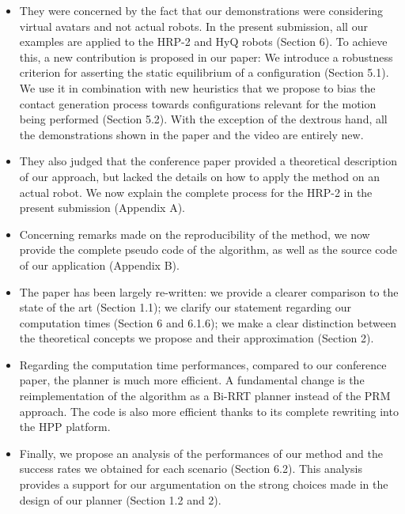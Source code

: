 \documentclass[a4paper]{article}
\begin{document}
\begin{itemize}
\item They were concerned by the fact that our demonstrations were
considering virtual avatars and not actual robots. In the present
submission, all our examples are applied to the HRP-2 and HyQ robots (Section 6).
To achieve this, a new contribution is proposed in our paper:
We introduce a robustness criterion for asserting the static equilibrium
of a configuration (Section 5.1). We use it in combination with new heuristics that we
propose to bias the contact generation process towards configurations
relevant for the motion being performed (Section 5.2).
With the exception of the dextrous hand, all the demonstrations shown in
the paper and the video are entirely new.

\item They also judged that the conference paper provided a theoretical
description of our approach, but lacked the details on how to apply
the method on an actual robot. We now explain the complete process
for the HRP-2 in the present submission (Appendix A).

\item Concerning remarks made on the reproducibility of the method,
we now provide the complete pseudo code of the algorithm, as well as the
source code of our application (Appendix B).

\item The paper has been largely re-written: we provide a clearer
comparison to the state of the art (Section 1.1); we clarify our statement regarding
our computation times (Section 6 and 6.1.6); we make a clear distinction between the
theoretical concepts we propose and their approximation (Section 2).

\item Regarding the computation time performances, compared to our conference paper, the planner is much more efficient.
A fundamental change is the reimplementation of the algorithm as a Bi-RRT planner instead of the PRM
approach. The code is also more efficient thanks to its complete rewriting into the HPP platform.

\item Finally, we propose an analysis of the performances of our method and
the success rates we obtained for each scenario (Section 6.2). This analysis provides
a support for our argumentation on the strong choices made in the design
of our planner (Section 1.2 and 2).
\end{itemize}
\end{document}
